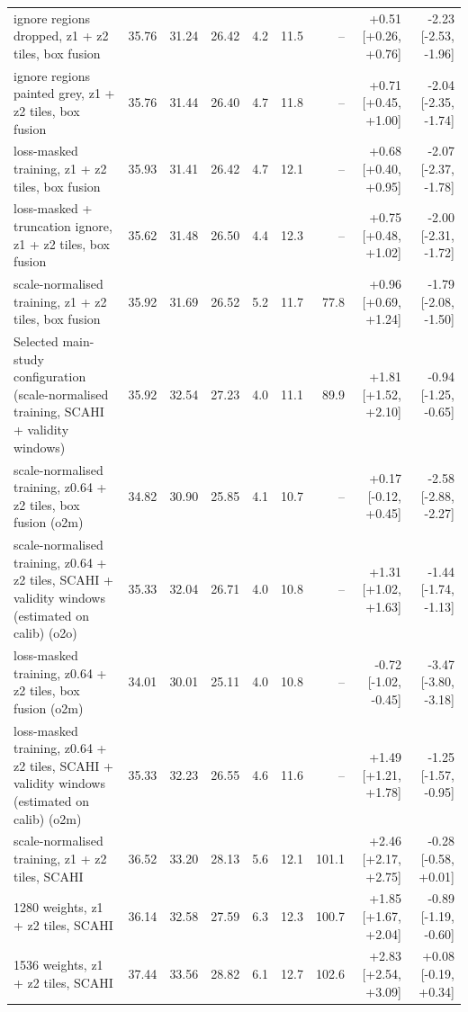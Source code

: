 \begin{tabular}{lrrrrrrrr}
\midrule
ignore regions dropped, z1 + z2 tiles, box fusion & 35.76 & 31.24 & 26.42 & 4.2 & 11.5 & -- & +0.51 {\scriptsize[+0.26, +0.76]} & -2.23 {\scriptsize[-2.53, -1.96]} \\
ignore regions painted grey, z1 + z2 tiles, box fusion & 35.76 & 31.44 & 26.40 & 4.7 & 11.8 & -- & +0.71 {\scriptsize[+0.45, +1.00]} & -2.04 {\scriptsize[-2.35, -1.74]} \\
loss-masked training, z1 + z2 tiles, box fusion & 35.93 & 31.41 & 26.42 & 4.7 & 12.1 & -- & +0.68 {\scriptsize[+0.40, +0.95]} & -2.07 {\scriptsize[-2.37, -1.78]} \\
loss-masked + truncation ignore, z1 + z2 tiles, box fusion & 35.62 & 31.48 & 26.50 & 4.4 & 12.3 & -- & +0.75 {\scriptsize[+0.48, +1.02]} & -2.00 {\scriptsize[-2.31, -1.72]} \\
scale-normalised training, z1 + z2 tiles, box fusion & 35.92 & 31.69 & 26.52 & 5.2 & 11.7 & 77.8 & +0.96 {\scriptsize[+0.69, +1.24]} & -1.79 {\scriptsize[-2.08, -1.50]} \\
Selected main-study configuration (scale-normalised training, SCAHI + validity windows) & 35.92 & 32.54 & 27.23 & 4.0 & 11.1 & 89.9 & +1.81 {\scriptsize[+1.52, +2.10]} & -0.94 {\scriptsize[-1.25, -0.65]} \\
scale-normalised training, z0.64 + z2 tiles, box fusion (o2m) & 34.82 & 30.90 & 25.85 & 4.1 & 10.7 & -- & +0.17 {\scriptsize[-0.12, +0.45]} & -2.58 {\scriptsize[-2.88, -2.27]} \\
scale-normalised training, z0.64 + z2 tiles, SCAHI + validity windows (estimated on calib) (o2o) & 35.33 & 32.04 & 26.71 & 4.0 & 10.8 & -- & +1.31 {\scriptsize[+1.02, +1.63]} & -1.44 {\scriptsize[-1.74, -1.13]} \\
loss-masked training, z0.64 + z2 tiles, box fusion (o2m) & 34.01 & 30.01 & 25.11 & 4.0 & 10.8 & -- & -0.72 {\scriptsize[-1.02, -0.45]} & -3.47 {\scriptsize[-3.80, -3.18]} \\
loss-masked training, z0.64 + z2 tiles, SCAHI + validity windows (estimated on calib) (o2m) & 35.33 & 32.23 & 26.55 & 4.6 & 11.6 & -- & +1.49 {\scriptsize[+1.21, +1.78]} & -1.25 {\scriptsize[-1.57, -0.95]} \\
scale-normalised training, z1 + z2 tiles, SCAHI & 36.52 & 33.20 & 28.13 & 5.6 & 12.1 & 101.1 & +2.46 {\scriptsize[+2.17, +2.75]} & -0.28 {\scriptsize[-0.58, +0.01]} \\
1280 weights, z1 + z2 tiles, SCAHI & 36.14 & 32.58 & 27.59 & 6.3 & 12.3 & 100.7 & +1.85 {\scriptsize[+1.67, +2.04]} & -0.89 {\scriptsize[-1.19, -0.60]} \\
1536 weights, z1 + z2 tiles, SCAHI & 37.44 & 33.56 & 28.82 & 6.1 & 12.7 & 102.6 & +2.83 {\scriptsize[+2.54, +3.09]} & +0.08 {\scriptsize[-0.19, +0.34]} \\
\bottomrule
\end{tabular}
